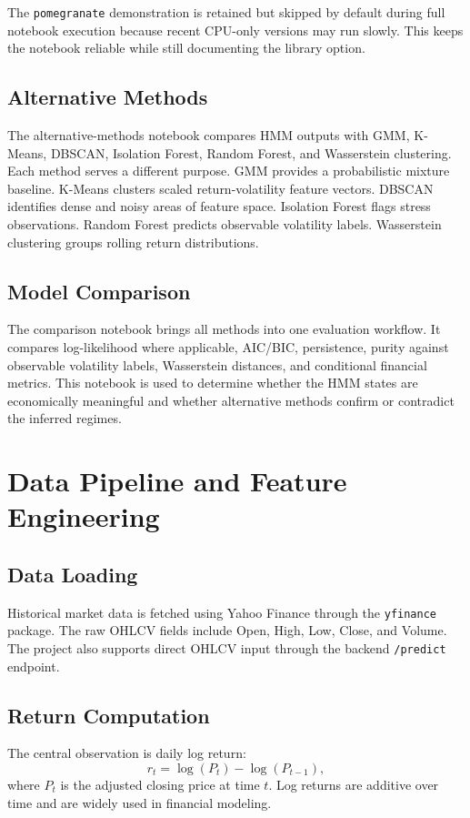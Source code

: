 \documentclass[12pt,a4paper]{report}
\begin{document}
The \texttt{pomegranate} demonstration is retained but skipped by default during full notebook execution because recent CPU-only versions may run slowly. This keeps the notebook reliable while still documenting the library option.

\section{Alternative Methods}
The alternative-methods notebook compares HMM outputs with GMM, K-Means, DBSCAN, Isolation Forest, Random Forest, and Wasserstein clustering. Each method serves a different purpose. GMM provides a probabilistic mixture baseline. K-Means clusters scaled return-volatility feature vectors. DBSCAN identifies dense and noisy areas of feature space. Isolation Forest flags stress observations. Random Forest predicts observable volatility labels. Wasserstein clustering groups rolling return distributions.

\section{Model Comparison}
The comparison notebook brings all methods into one evaluation workflow. It compares log-likelihood where applicable, AIC/BIC, persistence, purity against observable volatility labels, Wasserstein distances, and conditional financial metrics. This notebook is used to determine whether the HMM states are economically meaningful and whether alternative methods confirm or contradict the inferred regimes.

\chapter{Data Pipeline and Feature Engineering}
\section{Data Loading}
Historical market data is fetched using Yahoo Finance through the \texttt{yfinance} package. The raw OHLCV fields include Open, High, Low, Close, and Volume. The project also supports direct OHLCV input through the backend \texttt{/predict} endpoint.

\section{Return Computation}
The central observation is daily log return:
\begin{equation}
    r_t = \log(P_t) - \log(P_{t-1}),
\end{equation}
where $P_t$ is the adjusted closing price at time $t$. Log returns are additive over time and are widely used in financial modeling.
\end{document}
